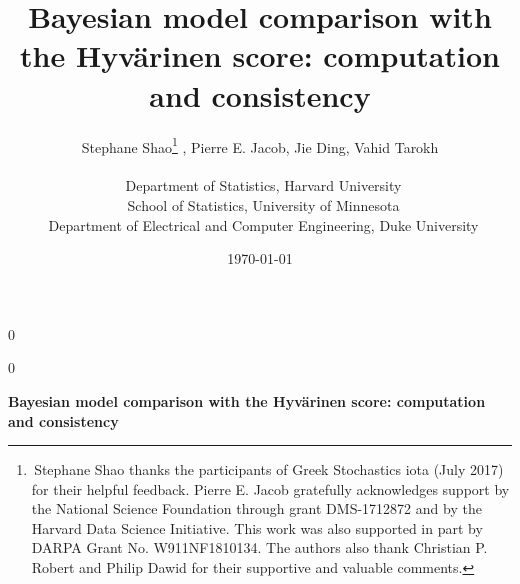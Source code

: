\documentclass[12pt]{article}
\theoremstyle{plain}
\theoremstyle{definition}
\newcommand{\blind}{0}
\begin{document}
	
	
	\def\spacingset#1{\renewcommand{\baselinestretch}%
		{#1}\small\normalsize} \spacingset{1}
	
	
	
	\blind
	{
		\title{\bf Bayesian model comparison with the Hyv{\"a}rinen score: computation and consistency}
		\author{Stephane Shao\thanks{\,Stephane Shao thanks the participants of Greek Stochastics iota (July 2017) for their helpful feedback. Pierre E. Jacob gratefully acknowledges support by the National Science Foundation through grant DMS-1712872 and by the Harvard Data Science Initiative. This work was also supported in part by DARPA Grant No.\! W911NF1810134. The authors also thank Christian P. Robert and Philip Dawid for their supportive and valuable comments.} , Pierre E. Jacob\footnotemark[1] , Jie Ding\footnotemark[2] , Vahid Tarokh\footnotemark[3]
			\\
			\\
			\footnotemark[1]\, Department of Statistics, Harvard University\\
			\footnotemark[2]\, School of Statistics, University of Minnesota\\
			\footnotemark[3]\, Department of Electrical and Computer Engineering, Duke University}
		\date{\today}
		\maketitle
		\vspace*{-1cm}
	} \fi
	
	
	
	\blind
	{
		\bigskip
		\bigskip
		\bigskip
		\begin{center}
			{\LARGE\bf Bayesian model comparison with the Hyv{\"a}rinen score: computation and consistency}
		\end{center}
		\medskip
	} \fi
	
\end{document}
